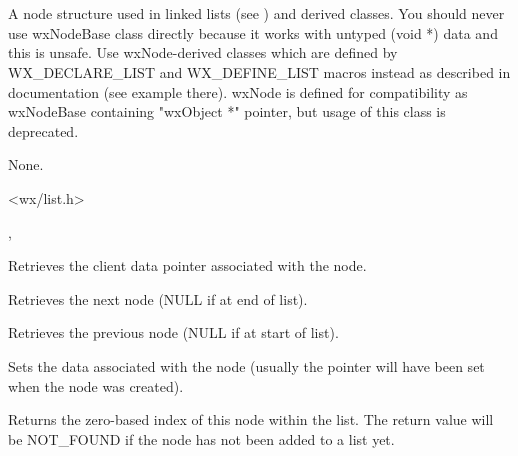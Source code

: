 \section{}\label{wxnode}

A node structure used in linked lists (see ) and
derived classes. You should never use wxNodeBase class directly because it
works with untyped (void *) data and this is unsafe. Use wxNode-derived classes
which are defined by WX\_DECLARE\_LIST and WX\_DEFINE\_LIST macros instead as
described in  documentation (see example there). wxNode
is defined for compatibility as wxNodeBase containing "wxObject *" pointer, but
usage of this class is deprecated.


None.


<wx/list.h>


, 




Retrieves the client data pointer associated with the node.



Retrieves the next node (NULL if at end of list).



Retrieves the previous node (NULL if at start of list).



Sets the data associated with the node (usually the pointer will have been
set when the node was created).



Returns the zero-based index of this node within the list. The return value
will be NOT\_FOUND if the node has not been added to a list yet.

